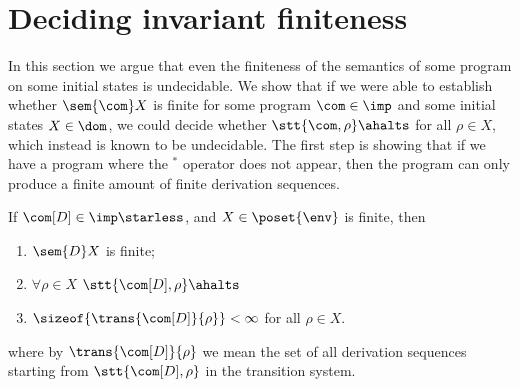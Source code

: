 \section{Deciding invariant finiteness}\label{sec:finiteness}

In this section we argue that even the finiteness of the semantics of
some program on some initial states is undecidable. We show that if we
were able to establish whether \(\sem{\com}X\) is finite for some
program \(\com\in\imp\) and some initial states \(X\in \dom\), we
could decide whether \(\stt{\com, \rho}\ahalts\) for all
\(\rho \in X\), which instead is known to be undecidable. The first
step is showing that if we have a program where the \(^*\) operator
does not appear, then the program can only produce a finite amount of
finite derivation sequences.

\begin{lemma}\label{le:finiteness}
  If \(\com[D]\in\imp\starless\), and \(X \in \poset{\env}\) is
  finite, then
  \begin{enumerate}[label=(\roman*).,ref=\thetheorem.(\roman*)]
  \item\label{eq:fini} \(\sem{D}X\) is finite;
  \item\label{eq:finii} \(\forall \rho \in X\) \(\stt{\com[D], \rho}\ahalts\)
  \item\label{eq:finiii} \(\sizeof{\trans{\com[D]}{\rho}} < \infty\) for all
    \(\rho \in X\).
  \end{enumerate}

  where by \(\trans{\com[D]}{\rho}\) we mean the set of all derivation
  sequences starting from \(\stt{\com[D], \rho}\) in the transition
  system.
\end{lemma}

